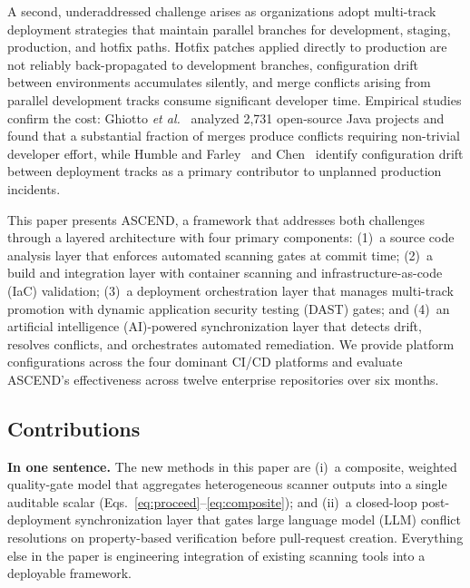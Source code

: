 \documentclass{ieeeaccess}
\begin{document}
A second, underaddressed challenge arises as organizations adopt multi-track deployment strategies that maintain parallel branches for development, staging, production, and hotfix paths. Hotfix patches applied directly to production are not reliably back-propagated to development branches, configuration drift between environments accumulates silently, and merge conflicts arising from parallel development tracks consume significant developer time. Empirical studies confirm the cost: Ghiotto \emph{et al.}~\cite{ghiotto2020merge} analyzed 2{,}731 open-source Java projects and found that a substantial fraction of merges produce conflicts requiring non-trivial developer effort, while Humble and Farley~\cite{humble2010continuous} and Chen~\cite{chen2015continuous} identify configuration drift between deployment tracks as a primary contributor to unplanned production incidents.

This paper presents ASCEND, a framework that addresses both challenges through a layered architecture with four primary components: (1)~a source code analysis layer that enforces automated scanning gates at commit time; (2)~a build and integration layer with container scanning and infrastructure-as-code (IaC) validation; (3)~a deployment orchestration layer that manages multi-track promotion with dynamic application security testing (DAST) gates; and (4)~an artificial intelligence (AI)-powered synchronization layer that detects drift, resolves conflicts, and orchestrates automated remediation. We provide platform configurations across the four dominant CI/CD platforms and evaluate ASCEND's effectiveness across twelve enterprise repositories over six months.

\subsection{Contributions}
\textbf{In one sentence.} The new methods in this paper are (i)~a composite, weighted quality-gate model that aggregates heterogeneous scanner outputs into a single auditable scalar (Eqs.~\eqref{eq:proceed}--\eqref{eq:composite}); and (ii)~a closed-loop post-deployment synchronization layer that gates large language model (LLM) conflict resolutions on property-based verification before pull-request creation. Everything else in the paper is engineering integration of existing scanning tools into a deployable framework.
\end{document}
